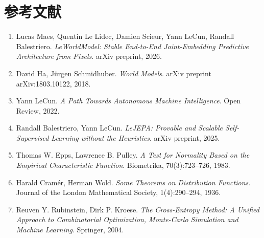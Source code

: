 \documentclass[12pt]{article}
\begin{document}
\section*{参考文献}

\begin{enumerate}
    \item Lucas Maes, Quentin Le Lidec, Damien Scieur, Yann LeCun, Randall Balestriero. \textit{LeWorldModel: Stable End-to-End Joint-Embedding Predictive Architecture from Pixels}. arXiv preprint, 2026.

    \item David Ha, Jürgen Schmidhuber. \textit{World Models}. arXiv preprint arXiv:1803.10122, 2018.

    \item Yann LeCun. \textit{A Path Towards Autonomous Machine Intelligence}. Open Review, 2022.

    \item Randall Balestriero, Yann LeCun. \textit{LeJEPA: Provable and Scalable Self-Supervised Learning without the Heuristics}. arXiv preprint, 2025.

    \item Thomas W. Epps, Lawrence B. Pulley. \textit{A Test for Normality Based on the Empirical Characteristic Function}. Biometrika, 70(3):723--726, 1983.

    \item Harald Cram\'er, Herman Wold. \textit{Some Theorems on Distribution Functions}. Journal of the London Mathematical Society, 1(4):290--294, 1936.

    \item Reuven Y. Rubinstein, Dirk P. Kroese. \textit{The Cross-Entropy Method: A Unified Approach to Combinatorial Optimization, Monte-Carlo Simulation and Machine Learning}. Springer, 2004.
\end{enumerate}
\end{document}
